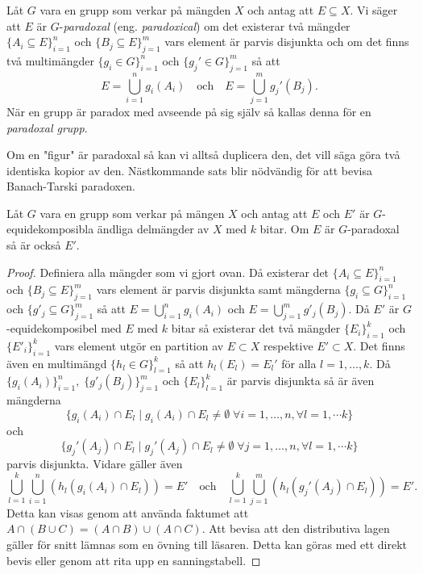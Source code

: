 \documentclass{article}
\theoremstyle{definition}
\begin{document}
\begin{mydef}{}{}
  Låt $G$ vara en grupp som verkar på mängden $X$ och antag att $E \subseteq X$. Vi säger att 
  $E$ är $G$-\textit{paradoxal} (eng. \textit{paradoxical}) om det existerar två mängder $\{A_i \subseteq E\}_{i = 1}^n$ och $\{B_j \subseteq E\}_{j = 1}^m$
  vars element är parvis disjunkta och om det finns två multimängder $\{g_i \in G\}_{i = 1}^n$ och $\{g_j' \in G\}_{j = 1}^m$ så att 
  \[E = \bigcup_{i = 1}^n g_i(A_i) \quad \text{och} \quad E = \bigcup_{j = 1}^m g_j'(B_j).\]
  När en grupp är paradox med avseende på sig själv så kallas denna för en \textit{paradoxal grupp}.
\end{mydef}

Om en "figur" är paradoxal så kan vi alltså duplicera den, det vill säga göra två identiska kopior av den. Nästkommande sats 
blir nödvändig för att bevisa Banach-Tarski paradoxen. 

\hypertarget{sats8.2.1}{}
\begin{mytheo}{}{}
  Låt $G$ vara en grupp som verkar på mängen $X$ och antag att $E$ och $E'$ är $G$-equidekomposibla ändliga delmängder av $X$
  med $k$ bitar. Om $E$ är $G$-paradoxal så är också $E'$.
\end{mytheo}

\begin{proof}
  Definiera alla mängder som vi gjort ovan. Då existerar det $\{A_i \subseteq E\}_{i = 1}^n$ och $\{B_j \subseteq E\}_{j = 1}^m$
  vars element är parvis disjunkta samt mängderna $\{g_i \subseteq G\}_{i = 1}^n$ och $\{g'_j \subseteq G\}_{j = 1}^m$ så att 
  $E = \bigcup_{i = 1}^n g_i(A_i)$ och $E = \bigcup_{j = 1}^m g'_j(B_j)$. Då $E'$ är $G$-equidekomposibel med $E$ med $k$ bitar så existerar 
  det två mängder $\{E_i\}_{i = 1}^k$ och $\{E'_i\}_{i = 1}^k$ vars element utgör en partition av $E \subset X$ respektive $E' \subset X$.
  Det finns även en multimängd $\{h_l \in G\}_{l = 1}^k$ så att $h_l(E_l) = E_l'$ för alla $l = 1, \ldots, k$. Då 
  $\{g_i(A_i)\}_{i = 1}^n, \; \{g'_j(B_j)\}_{j = 1}^m$ och $\{E_l\}_{l = 1}^k$ är parvis disjunkta så är även mängderna 
  \[ \{g_i(A_i) \cap E_l \; | \; g_i(A_i) \cap E_l \neq \emptyset \; \forall i = 1, \ldots, n, \forall l = 1, \cdots k\} \]
  och
  \[ \{g_j'(A_j) \cap E_l \; | \; g_j'(A_j) \cap E_l \neq \emptyset \; \forall j = 1, \ldots, n, \forall l = 1, \cdots k\} \]
  parvis disjunkta. Vidare gäller även
  \[ \bigcup_{l = 1}^k \bigcup_{i = 1}^n (h_l(g_i(A_i) \cap E_l)) = E' \quad \text{och} \quad
  \bigcup_{l = 1}^k \bigcup_{j = 1}^m (h_l(g_j'(A_j) \cap E_l)) = E'.\]
  Detta kan visas genom att använda faktumet att $A \cap (B \cup C) = (A \cap B) \cup (A \cap C)$. Att bevisa att den distributiva lagen 
  gäller för snitt lämnas som en övning till läsaren. Detta kan göras med ett direkt bevis eller genom att rita upp en sanningstabell.
\end{proof}
\end{document}
